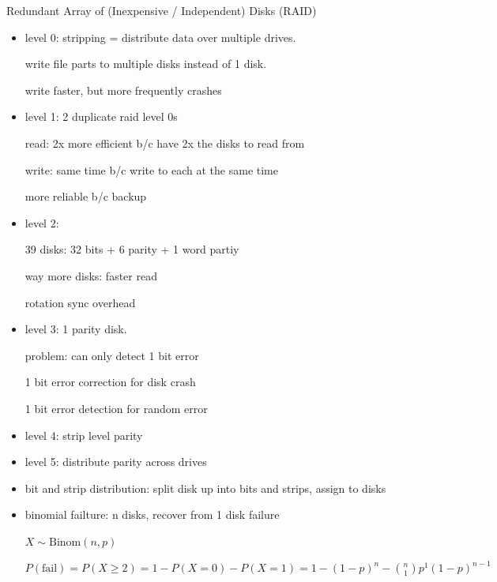 \documentclass[11pt]{article}
\begin{document}
Redundant Array of (Inexpensive / Independent) Disks (RAID)
\begin{itemize}
    \item level 0: stripping = distribute data over multiple drives.

        write file parts to multiple disks instead of 1 disk.
        
        write faster, but more frequently crashes

    \item level 1: 2 duplicate raid level 0s

        read: 2x more efficient b/c have 2x the disks to read from

        write: same time b/c write to each at the same time

        more reliable b/c backup

    \item level 2:

        39 disks: 32 bits + 6 parity + 1 word partiy

        way more disks: faster read

        rotation sync overhead

    \item level 3: 1 parity disk.

        problem: can only detect 1 bit error

        1 bit error correction for disk crash

        1 bit error detection for random error

    \item level 4: strip level parity

    \item level 5: distribute parity across drives

    \item bit and strip distribution: split disk up into bits and strips, assign to disks

    \item binomial failture: n disks, recover from 1 disk failure

        $X \sim \text{Binom}(n, p)$

        $P(\text{fail}) = P(X \ge 2) = 1 - P(X = 0) - P(X = 1) = 1 - (1-p)^n - \binom{n}{1} p^1 (1-p)^{n-1}$
\end{itemize}
\end{document}
